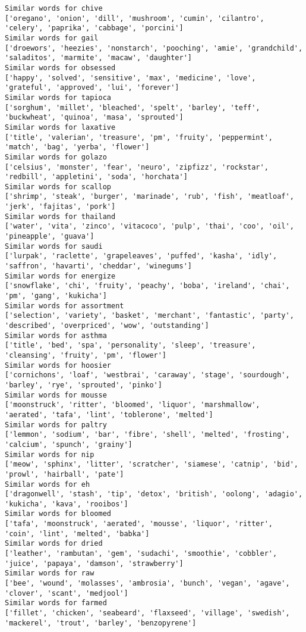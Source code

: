 \documentclass[11pt]{article}
\begin{document}
\begin{Verbatim}[commandchars=\\\{\}]
Similar words for chive
['oregano', 'onion', 'dill', 'mushroom', 'cumin', 'cilantro', 'celery', 'paprika', 'cabbage', 'porcini']
Similar words for gail
['droewors', 'heezies', 'nonstarch', 'pooching', 'amie', 'grandchild', 'saladitos', 'marmite', 'macaw', 'daughter']
Similar words for obsessed
['happy', 'solved', 'sensitive', 'max', 'medicine', 'love', 'grateful', 'approved', 'lui', 'forever']
Similar words for tapioca
['sorghum', 'millet', 'bleached', 'spelt', 'barley', 'teff', 'buckwheat', 'quinoa', 'masa', 'sprouted']
Similar words for laxative
['title', 'valerian', 'treasure', 'pm', 'fruity', 'peppermint', 'match', 'bag', 'yerba', 'flower']
Similar words for golazo
['celsius', 'monster', 'fear', 'neuro', 'zipfizz', 'rockstar', 'redbill', 'appletini', 'soda', 'horchata']
Similar words for scallop
['shrimp', 'steak', 'burger', 'marinade', 'rub', 'fish', 'meatloaf', 'jerk', 'fajitas', 'pork']
Similar words for thailand
['water', 'vita', 'zinco', 'vitacoco', 'pulp', 'thai', 'coo', 'oil', 'pineapple', 'guava']
Similar words for saudi
['lurpak', 'raclette', 'grapeleaves', 'puffed', 'kasha', 'idly', 'saffron', 'havarti', 'cheddar', 'winegums']
Similar words for energize
['snowflake', 'chi', 'fruity', 'peachy', 'boba', 'ireland', 'chai', 'pm', 'gang', 'kukicha']
Similar words for assortment
['selection', 'variety', 'basket', 'merchant', 'fantastic', 'party', 'described', 'overpriced', 'wow', 'outstanding']
Similar words for asthma
['title', 'bed', 'spa', 'personality', 'sleep', 'treasure', 'cleansing', 'fruity', 'pm', 'flower']
Similar words for hoosier
['cornichons', 'loaf', 'westbrai', 'caraway', 'stage', 'sourdough', 'barley', 'rye', 'sprouted', 'pinko']
Similar words for mousse
['moonstruck', 'ritter', 'bloomed', 'liquor', 'marshmallow', 'aerated', 'tafa', 'lint', 'toblerone', 'melted']
Similar words for paltry
['lemmon', 'sodium', 'bar', 'fibre', 'shell', 'melted', 'frosting', 'calcium', 'spunch', 'grainy']
Similar words for nip
['meow', 'sphinx', 'litter', 'scratcher', 'siamese', 'catnip', 'bid', 'prowl', 'hairball', 'pate']
Similar words for eh
['dragonwell', 'stash', 'tip', 'detox', 'british', 'oolong', 'adagio', 'kukicha', 'kava', 'rooibos']
Similar words for bloomed
['tafa', 'moonstruck', 'aerated', 'mousse', 'liquor', 'ritter', 'coin', 'lint', 'melted', 'babka']
Similar words for dried
['leather', 'rambutan', 'gem', 'sudachi', 'smoothie', 'cobbler', 'juice', 'papaya', 'damson', 'strawberry']
Similar words for raw
['bee', 'wound', 'molasses', 'ambrosia', 'bunch', 'vegan', 'agave', 'clover', 'scant', 'medjool']
Similar words for farmed
['fillet', 'chicken', 'seabeard', 'flaxseed', 'village', 'swedish', 'mackerel', 'trout', 'barley', 'benzopyrene']

\end{Verbatim}
\end{document}
